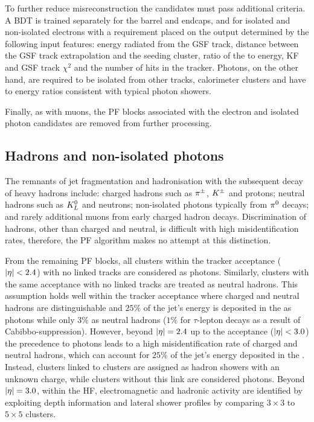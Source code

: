 To further reduce misreconstruction the candidates must pass additional
criteria. A BDT is trained separately for the barrel and endcaps, and for
isolated and non-isolated electrons with a requirement placed on the output
determined by the following input features: energy radiated from the GSF
track, distance between the GSF track extrapolation and the \ECAL seeding
cluster, ratio of the \HCAL to \ECAL energy, KF and GSF track $\chi^2$ and the
number of hits in the tracker. Photons, on the other hand, are required to be
isolated from other tracks, calorimeter clusters and have \HCAL to \ECAL
energy ratios consistent with typical photon showers.

Finally, as with muons, the PF blocks associated with the electron and
isolated photon candidates are removed from further processing.


\subsection{Hadrons and non-isolated photons}

The remnants of jet fragmentation and hadronisation with the subsequent decay
of heavy hadrons include: charged hadrons such as $\pi^{\pm}$, $K^{\pm}$ and
protons; neutral hadrons such as $K_L^{0}$ and neutrons; non-isolated photons
typically from $\pi^{0}$ decays; and rarely additional muons from early
charged hadron decays. Discrimination of hadrons, other than charged and
neutral, is difficult with high misidentification rates, therefore, the PF
algorithm makes no attempt at this distinction.

From the remaining PF blocks, all \ECAL clusters within the tracker acceptance
(${|\eta|<2.4}$) with no linked tracks are considered as photons. Similarly,
\HCAL clusters with the same acceptance with no linked tracks are treated as
neutral hadrons. This assumption holds well within the tracker acceptance where
charged and neutral hadrons are distinguishable and $25\%$ of the jet's energy
is deposited in the \ECAL as photons while only $3\%$ as neutral hadrons
($1\%$ for $\tau$-lepton decays as a result of Cabibbo-suppression). However,
beyond ${|\eta|=2.4}$ up to the \ECAL acceptance (${|\eta|<3.0}$) the precedence
to photons leads to a high misidentification rate of charged and neutral
hadrons, which can account for $25\%$ of the jet's energy deposited in the
\ECAL. Instead, \ECAL clusters linked to \HCAL clusters are assigned as hadron
showers with an unknown charge, while \ECAL clusters without this link are
considered photons. Beyond ${|\eta|=3.0}$, within the HF, electromagnetic and
hadronic activity are identified by exploiting depth information and lateral
shower profiles by comparing $3\times 3$ to $5\times 5$ clusters.

